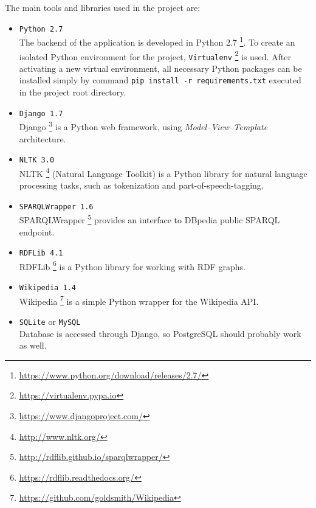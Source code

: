 \documentclass[12pt, twoside]{fithesis2}
\renewcommand{\_}{\leavevmode \kern0.07em\vbox{\hrule width0.4em}}
\newcommand{\squarebullet}{\textcolor{black}{\raisebox{0.15em}{\rule{4pt}{4pt}}}}
\newcommand{\emptysquarebullet}{\textcolor{black}{\raisebox{0.10em}{\tiny$\square$}}}
\newenvironment{myItemize}{
  \begin{itemize}[leftmargin=2em,rightmargin=1em,itemsep=\parskip ,parsep=0em,topsep=0em,partopsep=0em]
  \renewcommand{\labelitemi}{\squarebullet}
  \renewcommand{\labelitemii}{\textbullet}
}{
  \end{itemize}
}
\begin{document}
The main tools and libraries used in the project are:
\begin{myItemize}
\item \texttt{Python 2.7}\\
The backend of the application is developed in Python 2.7%
\footnote{\url{https://www.python.org/download/releases/2.7/}}.
To create an isolated Python environment for the project, \texttt{Virtualenv}%
\footnote{\url{https://virtualenv.pypa.io}} is used.
After activating a new virtual environment, all necessary Python packages can be installed simply by
command \texttt{pip install -r requirements.txt} executed in the project root directory.

\item \texttt{Django 1.7}\\
Django%
\footnote{\url{https://www.djangoproject.com/}}
is a Python web framework, using \emph{Model--View--Template} architecture.


\item \texttt{NLTK 3.0}\\
NLTK%
\footnote{\url{http://www.nltk.org/}}
(Natural Language Toolkit) is a Python library for natural language processing tasks,
such as tokenization and part-of-speech-tagging.

\item \texttt{SPARQLWrapper 1.6}\\
SPARQLWrapper%
\footnote{\url{http://rdflib.github.io/sparqlwrapper/}}
provides an interface to DBpedia public SPARQL endpoint.

\item \texttt{RDFLib 4.1}\\
RDFLib%
\footnote{\url{https://rdflib.readthedocs.org/}}
is a Python library for working with RDF graphs.

\item \texttt{Wikipedia 1.4}\\
Wikipedia%
\footnote{\url{https://github.com/goldsmith/Wikipedia}}
is a simple Python wrapper for the Wikipedia API.

\item \texttt{SQLite} or \texttt{MySQL}\\
Database is accessed through Django,
so PostgreSQL should probably work as well.


\end{myItemize}
\end{document}

